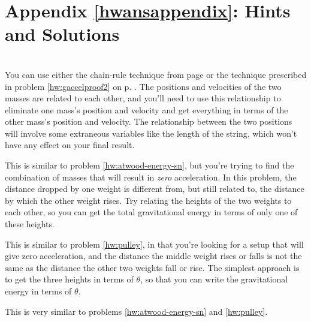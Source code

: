 \label{hwansappendix}%
\appendix\chapter{Appendix \ref{hwansappendix}: Hints and Solutions}



\noindent{}

\noindent{}\\
\label{hwhint:atwood-energy-sn} You can use either
the chain-rule technique from page  \pageref{gaccelproof} or the technique prescribed
in problem \ref{hw:gaccelproof2} on p. \pageref{hw:gaccelproof2}. The
positions and velocities of the two masses are related to each other, and you'll need
to use this relationship to eliminate one mass's position and velocity and get everything
in terms of the other mass's position and velocity. The relationship between the
two positions will involve some extraneous variables like the length of the string,
which won't have any effect on your final result.

\label{hwhint:pulley} This is similar to problem \ref{hw:atwood-energy-sn},
but you're trying to find the combination of masses that will result in \emph{zero}
acceleration. In this problem, the distance dropped
by one weight is different from, but still related to,
 the distance by which the other weight rises. Try relating the heights of the
 two weights to each other, so you can get the total gravitational energy in terms
 of only one of these heights.
 
\label{hwhint:tightropish} This is similar to problem
\ref{hw:pulley}, in that you're looking for a setup that will give zero
acceleration, and the distance the middle weight rises or falls is not the same as the distance
the other two weights fall or rise. The simplest approach is to get the three heights
in terms of $\theta$, so that you can write the gravitational energy in terms of $\theta$.

\label{hwhint:funkyatwood} This is very similar to problems
\ref{hw:atwood-energy-sn} and \ref{hw:pulley}.

